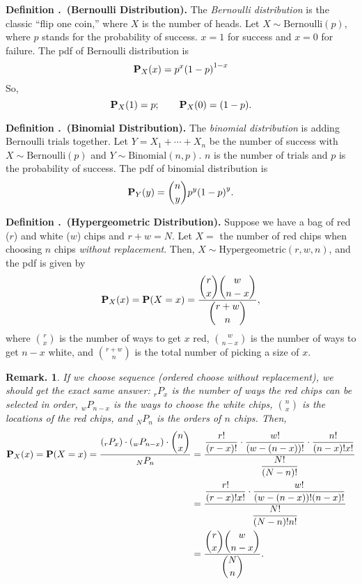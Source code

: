 \documentclass[12pt, a4paper]{article}
\newcounter{index}[subsection]
\newenvironment*{df}[1]{\par\noindent\textbf{Definition \thesubsection.\stepcounter{index}\theindex\ (#1).}}{\par}
\newtheorem*{rmk}{Remark.}
\def\dsst{\displaystyle}
\def\P{\vb{P}}
\newcommand\perm[2][n]{_{#1}P_{#2}}
\begin{document}
\begin{df}{Bernoulli Distribution}
	The \textit{Bernoulli distribution} is the classic ``flip one coin,'' where $X$ is the number of heads. Let $X\sim\text{Bernoulli}(p)$, where $p$ stands for the probability of success. $x=1$ for success and $x=0$ for failure. The pdf of Bernoulli distribution is \[\P_X(x)=p^x\qty(1-p)^{1-x}\] So, \[\P_X(1)=p;\qquad \P_X(0)=(1-p).\]
\end{df}
\begin{df}{Binomial Distribution}
	The \textit{binomial distribution} is adding Bernoulli trials together. Let $Y=X_1+\cdots+X_n$ be the number  of success with $X\sim\text{Bernoulli}(p)$ and $Y\sim\text{Binomial}(n,p)$. $n$ is the number of trials and $p$ is the probability of success. The pdf of binomial distribution is \[\P_Y(y)=\binom{n}{y}p^y\qty(1-p)^y.\]
\end{df}
\begin{df}{Hypergeometric Distribution}
	Suppose we have a bag of red ($r$)	 and white ($w$) chips and $r+w=N$. Let $X=$ the number of red chips when choosing $n$ chips \textit{without replacement}. Then, $X\sim\text{Hypergeometric}(r,w,n)$, and the pdf is given by \[\P_X(x)=\P(X=x)=\dfrac{\dsst\binom{r}{x}\binom{w}{n-x}}{\dsst\binom{r+w}{n}},\] where $\dsst\binom{r}{x}$ is the number of ways to get $x$ red, $\dsst\binom{w}{n-x}$ is the number of ways to get $n-x$ white, and $\dsst\binom{r+w}{n}$ is the total number of picking a size of $x$.
\end{df}
\begin{rmk}
	If we choose sequence (ordered choose without replacement), we should get the exact same answer: $\perm[r]{x}$ is the number of ways the red chips can be selected in order, $\perm[w]{n-x}$ is the ways to choose the white chips, $\dsst\binom{n}{x}$ is the locations of the red chips, and $\perm[N]{n}$ is the orders of $n$ chips. Then, 
	\begin{align*}
		\P_X(x)=\P(X=x)=\dfrac{\qty(\perm[r]{x})\cdot\qty(\perm[w]{n-x})\cdot\dsst\binom{n}{x}}{\perm[N]{n}}&=\dfrac{\dfrac{r!}{(r-x)!}\cdot\dfrac{w!}{(w-(n-x))!}\cdot\dfrac{n!}{(n-x)!x!}}{\dfrac{N!}{(N-n)!}}\\
		&=\dfrac{\dfrac{r!}{(r-x)!x!}\cdot\dfrac{w!}{(w-(n-x))!(n-x)!}}{\dfrac{N!}{(N-n)!n!}}\\&=\dfrac{\dsst\binom{r}{x}\binom{w}{n-x}}{\dsst\binom{N}{n}}.
	\end{align*}
\end{rmk}
\end{document}
